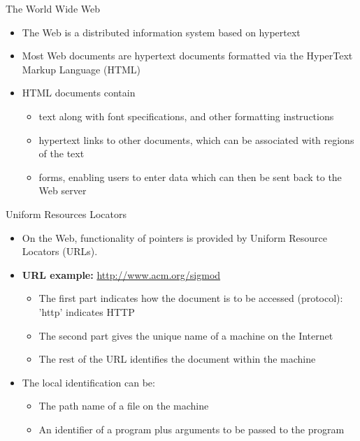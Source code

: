 \documentclass[aspectratio=169, xcolor=dvipsnames]{beamer}
\begin{document}
\begin{frame}{The World Wide Web}
    \begin{itemize}[<+->]
        \item The Web is a distributed information system based on hypertext
        \item Most Web documents are hypertext documents formatted via the HyperText Markup Language (HTML)
        \item HTML documents contain
        \begin{itemize}
            \item[$\triangleright$] text along with font specifications, and other formatting instructions
            \item[$\triangleright$] hypertext links to other documents, which can be associated with regions of the text
            \item[$\triangleright$] forms, enabling users to enter data which can then be sent back to the Web server
        \end{itemize}
    \end{itemize}
\end{frame}

\begin{frame}{Uniform Resources Locators}
    \begin{itemize}[<+->]
        \item On the Web, functionality of pointers is provided by Uniform Resource Locators (URLs).
        \item \textbf{URL example:} \url{http://www.acm.org/sigmod}
        \begin{itemize}
            \item[$\triangleright$] The first part indicates how the document is to be accessed (protocol): 'http' indicates HTTP
            \item[$\triangleright$] The second part gives the unique name of a machine on the Internet
            \item[$\triangleright$] The rest of the URL identifies the document within the machine
        \end{itemize}
        \item The local identification can be:
        \begin{itemize}
            \item[$\triangleright$] The path name of a file on the machine
            \item[$\triangleright$] An identifier of a program plus arguments to be passed to the program
        \end{itemize}
    \end{itemize}
\end{frame}
\end{document}
